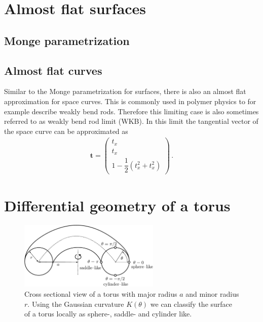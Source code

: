 \documentclass[11pt, DINA4, fleqn]{amsart}
\def\vt{\boldsymbol{t}\xspace}
\begin{document}
\section{Almost flat surfaces}

\subsection{Monge parametrization}

\subsection{Almost flat curves}
Similar to the Monge parametrization for surfaces, there is also an almost flat approximation for space curves. This is commonly used in polymer physics
to for example describe weakly bend rods. Therefore this limiting case is also sometimes referred to as weakly bend rod limit (WKB).
In this limit the tangential vector of the space curve can be approximated as
\begin{align}
\vt = \begin{pmatrix}
t_x \\
t_x \\
1- \dfrac{1}{2}(t_x^2 + t_x^2)
\end{pmatrix} \, .
\end{align}


\section{Differential geometry of a torus}
\begin{figure}[h]
	\centering
	\includegraphics[width=0.60\textwidth]{./figures/torus_cross_section}
	\caption{Cross sectional view of a torus with major radius $a$ and minor radius $r$. Using the Gaussian curvature $K(\theta)$ we can classify the surface of a torus locally as sphere-, saddle- and cylinder like.}
	\label{fig:torus_cross_section}
\end{figure}
\end{document}
